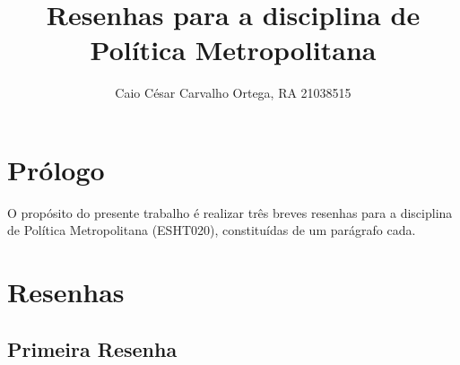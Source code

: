 \documentclass[hidelinks,a4paper,nofootinbib,aps,reprint,superscriptaddress]{revtex4}
\begin{document}
	
	\title{Resenhas para a disciplina de Política Metropolitana}
	
	
	
	
	\author{Caio César Carvalho Ortega, RA 21038515}
	
	
	\maketitle

	
	\section{Prólogo}
	
	O propósito do presente trabalho é realizar três breves resenhas para a disciplina de Política Metropolitana (ESHT020), constituídas de um parágrafo cada.
	
	\section{Resenhas}
	
	\subsection{Primeira Resenha}
	
\end{document}
